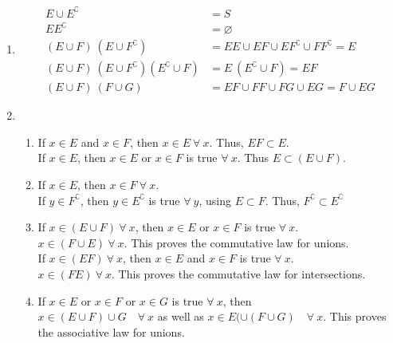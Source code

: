 \begin{enumerate}
	\item \begin{subequations}
		\begin{align}
			E \cup E^\complement &= S \\
			E E^\complement &= \varnothing \\
			(E \cup F)\ (E \cup F^\complement) &= EE \cup EF \cup EF^\complement \cup FF^\complement = E \\
			(E \cup F)\ (E \cup F^\complement) (E^\complement \cup F) &= E\ (E^\complement \cup F) = EF \\
			(E \cup F)\ (F \cup G) &= EF \cup FF \cup FG \cup EG = F \cup EG
		\end{align}
	\end{subequations}
	
	\item \begin{enumerate}
		
		\item If $ x \in E $ and $ x \in F $, then $ x \in E \ \forall\  x $. Thus, $ EF \subset E $. \\
		If $ x \in E $, then $ x \in E $ or $ x \in F $ is true $ \forall \ x $. Thus $ E \subset (E \cup F) $. \\
		
		\item If $ x \in E $, then $ x \in F \ \forall \ x$. \\
		If  $ y \in F^\complement $, then $ y \in E^\complement $ is true $ \forall \ y $, using $ E \subset F $. Thus, $ F^\complement \subset E^\complement $ \\
		
		\item If $ x \in (E \cup F) \ \forall\ x$, then $ x \in E $ or $ x \in F $ is true $ \forall \ x $.\\
		$ x \in (F \cup E) \ \forall\ x$. This proves the commutative law for unions. \\
		
		If $ x \in (E F) \ \forall\ x$, then $ x \in E $ and $ x \in F $ is true $ \forall \ x $.\\
		$ x \in (F  E) \ \forall\ x$. This proves the commutative law for intersections. \\
		
		\item If $ x \in E $ or $ x \in F $ or $ x \in G $ is true $ \forall \ x $, then \\
		$ x \in (E \cup F) \cup G \quad \forall \ x$ as well as $ x \in E(\cup (F \cup G) \quad \forall \ x$.
		This proves the associative law for unions. \\
		

\end{enumerate}
\end{enumerate}
